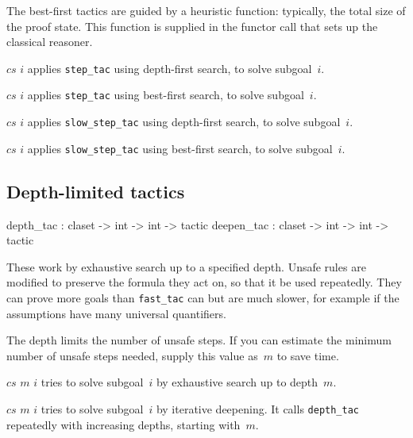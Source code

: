 The best-first tactics are guided by a heuristic function: typically, the
total size of the proof state.  This function is supplied in the functor call
that sets up the classical reasoner.
\begin{ttdescription}
\item[\ttindexbold{fast_tac} $cs$ $i$] applies {\tt step_tac} using
depth-first search, to solve subgoal~$i$.

\item[\ttindexbold{best_tac} $cs$ $i$] applies {\tt step_tac} using
best-first search, to solve subgoal~$i$.

\item[\ttindexbold{slow_tac} $cs$ $i$] applies {\tt slow_step_tac} using
depth-first search, to solve subgoal~$i$.

\item[\ttindexbold{slow_best_tac} $cs$ $i$] applies {\tt slow_step_tac} using
best-first search, to solve subgoal~$i$.
\end{ttdescription}


\subsection{Depth-limited tactics}
\begin{ttbox} 
depth_tac  : claset -> int -> int -> tactic
deepen_tac : claset -> int -> int -> tactic
\end{ttbox}
These work by exhaustive search up to a specified depth.  Unsafe rules are
modified to preserve the formula they act on, so that it be used repeatedly.
They can prove more goals than {\tt fast_tac} can but are much
slower, for example if the assumptions have many universal quantifiers.

The depth limits the number of unsafe steps.  If you can estimate the minimum
number of unsafe steps needed, supply this value as~$m$ to save time.
\begin{ttdescription}
\item[\ttindexbold{depth_tac} $cs$ $m$ $i$] 
tries to solve subgoal~$i$ by exhaustive search up to depth~$m$.

\item[\ttindexbold{deepen_tac} $cs$ $m$ $i$] 
tries to solve subgoal~$i$ by iterative deepening.  It calls {\tt depth_tac}
repeatedly with increasing depths, starting with~$m$.
\end{ttdescription}


